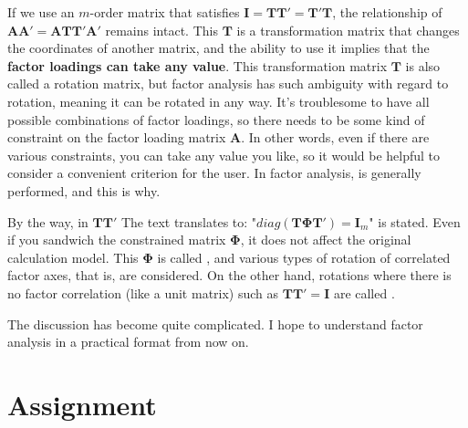 \documentclass{ltjsbook}
\begin{document}
If we use an $m$-order matrix that satisfies $\bm{I} = \bm{TT'}=\bm{T'T}$, the relationship of $\bm{AA'} = \bm{ATT'A'}$ remains intact. This $\bm{T}$ is a transformation matrix that changes the coordinates of another matrix, and the ability to use it implies that the \textbf{factor loadings can take any value}. This transformation matrix $\bm{T}$ is also called a rotation matrix, but factor analysis has such ambiguity with regard to rotation, meaning it can be rotated in any way. It's troublesome to have all possible combinations of factor loadings, so there needs to be some kind of constraint on the factor loading matrix $\bm{A}$. In other words, even if there are various constraints, you can take any value you like, so it would be helpful to consider a convenient criterion for the user. In factor analysis,  is generally performed, and this is why.


By the way, in $\bm{TT'}$
The text translates to: "$diag(\bm{T\Phi T'})=\bm{I}_m$" is stated.
Even if you sandwich the constrained matrix $\bm{\Phi}$, it does not affect the original calculation model.
This $\bm{\Phi}$ is called , and various types of rotation of correlated factor axes, that is,  are considered. On the other hand, rotations where there is no factor correlation (like a unit matrix) such as $\bm{TT'}=\bm{I}$ are called .


The discussion has become quite complicated. I hope to understand factor analysis in a practical format from now on.

\section{Assignment}

\end{document}
